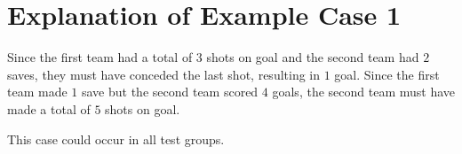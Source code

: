 \section*{Explanation of Example Case 1}
Since the first team had a total of $3$ shots on goal and the second team had $2$ saves, they must have conceded the last shot, resulting in $1$ goal.
Since the first team made $1$ save but the second team scored $4$ goals, the second team must have made a total of $5$ shots on goal.

This case could occur in all test groups.
